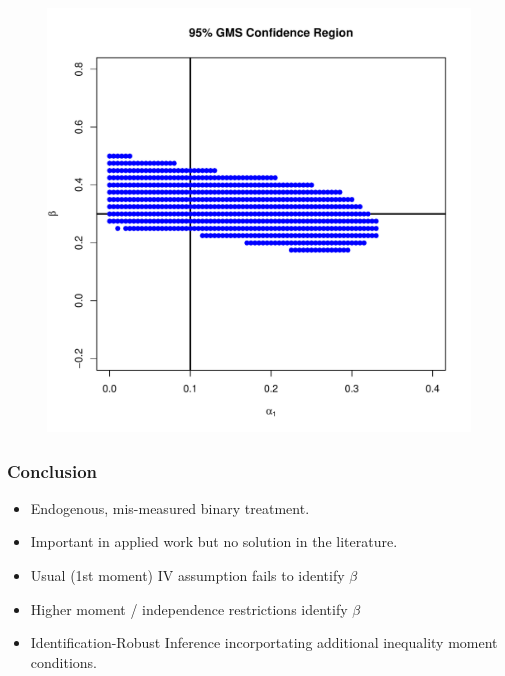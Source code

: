 \documentclass{beamer}
\begin{document}
\begin{frame}
  \begin{figure}
    \centering
    \includegraphics[scale=0.5]{GMS.pdf}
  \end{figure}
\end{frame}

\begin{frame}
  \frametitle{Conclusion}

  \begin{itemize}
    \item Endogenous, mis-measured binary treatment.
    \item Important in applied work but no solution in the literature.
      \item Usual (1st moment) IV assumption fails to identify $\beta$
      \item Higher moment / independence restrictions identify $\beta$
      \item Identification-Robust Inference incorportating additional inequality moment conditions.
   \end{itemize}

\end{frame}
\appendix
\end{document}
